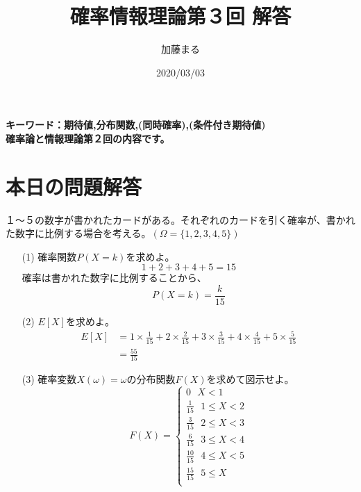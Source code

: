 \documentclass[a4j,uplatex]{jsarticle}
\title{確率情報理論第３回 解答}
\author{加藤まる}
\date{2020/03/03}
\begin{document}
\maketitle
\bf キーワード：期待値,分布関数,(同時確率),(条件付き期待値)
\\
\rm 確率論と情報理論第２回の内容です。

\section*{本日の問題解答}
１〜５の数字が書かれたカードがある。それぞれのカードを引く確率が、書かれた数字に比例する場合を考える。$(\Omega=\{ 1,2,3,4,5\})$
\begin{itemize}
  \item[(1)] 確率関数$P(X=k)$を求めよ。
  \begin{equation}
      1+2+3+4+5=15
  \end{equation} 
  確率は書かれた数字に比例することから、
  \begin{equation}
    P(X=k)=\frac{k}{15}
  \end{equation}
  \item[(2)] $E[X]$を求めよ。
  \begin{equation}
    \begin{split}
      E[X] &= {1}\times \frac{1}{15}+{2}\times \frac{2}{15}+{3}\times \frac{3}{15}+{4}\times \frac{4}{15}+{5}\times \frac{5}{15} \\
      &=\frac{55}{15}
    \end{split}
  \end{equation} 
  \item[(3)] 確率変数$X(\omega)=\omega$の分布関数$F(X)$を求めて図示せよ。
  \begin{equation}
    F(X)=
    \begin{cases}
      {0~~~X<1}\\
      {\frac{1}{15}~~~1\le X<2}\\
      {\frac{3}{15}~~~2\le X<3}\\
      {\frac{6}{15}~~~3\le X<4}\\
      {\frac{10}{15}~~~4\le X<5}\\
      {\frac{15}{15}~~~5\le X}\\
    \end{cases}
  \end{equation} 
\end{itemize}
\end{document}

